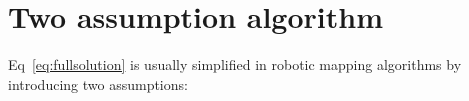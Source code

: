 \documentclass[letterpaper, 10 pt, conference]{ieeeconf} %
\begin{document}

\section{Two assumption algorithm}
Eq~\ref{eq:fullsolution} is usually simplified in robotic mapping algorithms by introducing two assumptions:
\begin{align}
\end{align}
\end{document}
